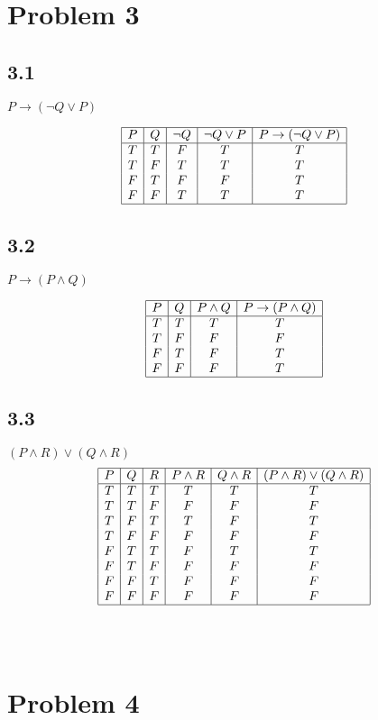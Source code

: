 \documentclass{article}
\begin{document}
\section*{Problem 3}
\begin{multicols}{2}
\subsection*{3.1}
$P\rightarrow ( \neg Q \vee P)$

\begin{displaymath}
\begin{array}{|c|c|c|c|c|}
\hline 
P & Q & \neg Q & \neg Q \vee P & P \rightarrow ( \neg Q \vee P)\\   %
\hline 
T & T & F & T & T \\
T & F & T & T & T \\
F & T & F & F & T \\
F & F & T & T & T \\
\hline 
\end{array}
\end{displaymath}

\subsection*{3.2}
$P\rightarrow ( P \land Q)$

\begin{displaymath}
\begin{array}{|c|c|c|c|}
\hline 
P & Q &  P \land Q & P \rightarrow  (P \land Q) \\   %
\hline 
T & T & T & T \\
T & F & F & F \\
F & T & F & T \\
F & F & F & T \\
\hline 
\end{array}
\end{displaymath}
\end{multicols}

\subsection*{3.3}
$(P \land R) \vee (Q \land R)$
\begin{displaymath}
\begin{array}{|c|c|c|c|c|c|}
\hline 
P & Q & R & P \land R & Q \land R & (P \land R) \vee (Q \land R)  \\   %
\hline 
T & T & T & T & T & T \\
T & T & F & F & F & F \\
T & F & T & T & F & T \\
T & F & F & F & F & F \\
F & T & T & F & T & T \\
F & T & F & F & F & F \\
F & F & T & F & F & F \\
F & F & F & F & F & F \\
\hline 
\end{array}
\end{displaymath}
\\\\
\section*{Problem 4}
\end{document}
